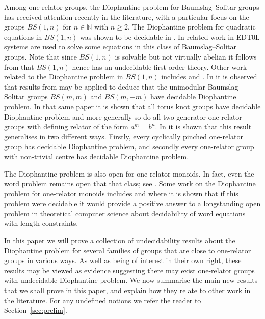 \documentclass[11pt]{amsart}
\theoremstyle{definition}
\numberwithin{theorem}{section}
\begin{document}
Among one-relator groups, the Diophantine problem for Baumslag--Solitar groups has received attention recently in the literature, with a particular focus on the groups $BS(1,n)$ for $n \in \mathbb{N}$ with $n \geq 2$. The Diophantine problem for quadratic equations in $BS(1, n)$ was shown to be decidable in
\cite{kharlampovich2020diophantine}.
In related work in 
\cite{Duncan2023}
EDT0L systems are used to solve some equations in this class of Baumslag--Solitar groups. Note that since $BS(1,n)$ is solvable but not virtually abelian it follows from \cite{Ersov72, noskov1984elementary, romanovskiui1981elementary}
that $BS(1,n)$ hence has an undecidable first-order theory. Other work related to the Diophantine problem in $BS(1,n)$ includes 
\cite{Mandel2023}
and \cite{Mandel2023b}. 
In \cite{CFOneRelatorDiophantine} it is observed that results from 
may be applied to deduce that the unimodular Baumslag--Solitar groups $BS(m,m)$ and $BS(m,-m)$ have decidable Diophantine problem. In that same paper it is shown that all torus knot groups have decidable Diophantine problem and more generally so do all two-generator one-relator groups with defining relator of the form $a^m = b^n$. In \cite{CiobanuGrayLevineInPrep} it is shown that this result generalises in two different ways. Firstly, every cyclically pinched one-relator group has decidable Diophantine problem, and secondly every one-relator group with non-trivial centre has decidable Diophantine problem.   

The Diophantine problem is also open for one-relator monoids. In fact, even the word problem remains open that that class; see \cite{CFOneRelatorMonoidsSuvey}. Some work on the Diophantine problem for one-relator monoids includes 
\cite{Kharlampovich2019} and  
\cite{Garreta2021}
where it is shown that if this problem were decidable it would provide a positive answer to a longstanding open problem in theoretical computer science about decidability of word equations with length constraints. 

In this paper we will prove a collection of undecidability results about the Diophantine problem for several families of groups that are close to one-relator groups in various ways. As well as being of interest in their own right, these results may be viewed as evidence 
suggesting there may exist 
one-relator groups with undecidable Diophantine problem.  
We now summarise the main new results that we shall prove in this paper, and explain how they relate to other work in the literature. For any undefined notions we refer the reader to Section~\ref{sec:prelim}.
\end{document}
